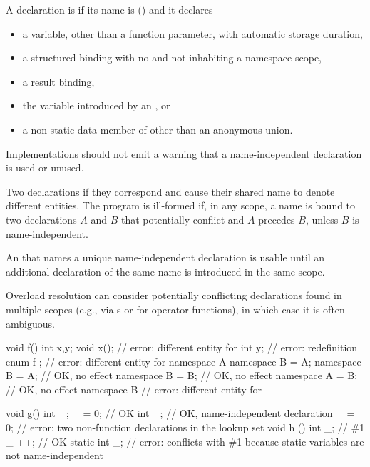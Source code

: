 \pnum
A declaration is 
if its name is \tcode{_} () and it declares
\begin{itemize}
\item
a variable, other than a function parameter, with automatic storage duration,
\item
a structured binding
with no  and
not inhabiting a namespace scope,
\item
a result binding,
\item
the variable introduced by an , or
\item
a non-static data member of other than an anonymous union.
\end{itemize}

\recommended
Implementations should not emit a warning
that a name-independent declaration is used or unused.

\pnum
{}%
Two declarations 
if they correspond and
cause their shared name to denote different entities.
The program is ill-formed
if, in any scope, a name is bound to two declarations $A$ and $B$
that potentially conflict and $A$ precedes $B$,
unless $B$ is name-independent.
\begin{note}
An  that names a unique name-independent declaration
is usable until an additional declaration of the same name
is introduced in the same scope.
\end{note}
\begin{note}
Overload resolution can consider potentially conflicting declarations
found in multiple scopes
(e.g., via s or for operator functions),
in which case it is often ambiguous.
\end{note}
\begin{example}
\begin{codeblock}
void f() {
  int x,y;
  void x();             // error: different entity for 
  int y;                // error: redefinition
}
enum { f };             // error: different entity for 
namespace A {}
namespace B = A;
namespace B = A;        // OK, no effect
namespace B = B;        // OK, no effect
namespace A = B;        // OK, no effect
namespace B {}          // error: different entity for 

void g() {
  int _;
  _ = 0;                // OK
  int _;                // OK, name-independent declaration
  _ = 0;                // error: two non-function declarations in the lookup set
}
void h () {
  int _;                // \#1
  _ ++;                 // OK
  static int _;         // error: conflicts with \#1 because static variables are not name-independent
}
\end{codeblock}
\end{example}

